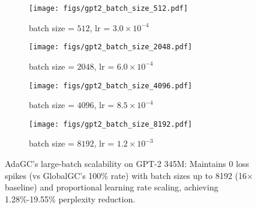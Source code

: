 \begin{figure*}[!ht]
    \vskip 0.1in
    \centering
    \begin{subfigure}{0.5\textwidth}
        \centering
        \texttt{[image: figs/gpt2\_batch\_size\_512.pdf]}
        \caption{batch size = $512$, lr = $3.0 \times 10^{-4}$}
        \label{fig:gpt2_bs_512}
    \end{subfigure}\hfill
    \begin{subfigure}{0.5\textwidth}
        \centering
        \texttt{[image: figs/gpt2\_batch\_size\_2048.pdf]}
        \caption{batch size = $2048$, lr = $6.0 \times 10^{-4}$}
        \label{fig:gpt2_bs_2048}
    \end{subfigure}\vfill
    \begin{subfigure}{0.5\textwidth}
        \centering
        \texttt{[image: figs/gpt2\_batch\_size\_4096.pdf]}
        \caption{batch size = $4096$, lr = $8.5 \times 10^{-4}$}
        \label{fig:gpt2_bs_4096}
    \end{subfigure}\hfill
    \begin{subfigure}{0.5\textwidth}
        \centering
        \texttt{[image: figs/gpt2\_batch\_size\_8192.pdf]}
        \caption{batch size = $8192$, lr = $1.2 \times 10^{-3}$}
        \label{fig:gpt2_bs_8192}
    \end{subfigure}
    \caption{AdaGC's large-batch scalability on GPT-2 345M: Maintains 0 loss spikes (vs GlobalGC's 100\% rate) with batch sizes up to 8192 (16$\times$ baseline) and proportional learning rate scaling, achieving 1.28\%-19.55\% perplexity reduction.}
    \label{fig:gpt2_large_bs_and_lr}
    \vskip -0.1in
\end{figure*}

